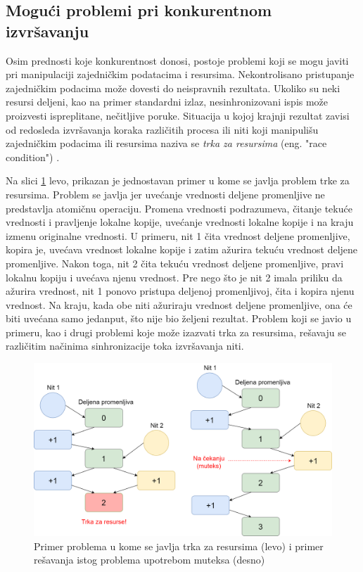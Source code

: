 \documentclass[12pt,oneside]{memoir}
\begin{document}
\subsection{Mogući problemi pri konkurentnom izvršavanju}

Osim prednosti koje konkurentnost donosi, postoje problemi koji se mogu javiti pri manipulaciji zajedničkim podatacima i resursima. Nekontrolisano pristupanje zajedničkim podacima može dovesti do neispravnih rezultata. Ukoliko su neki resursi deljeni, kao na primer standardni izlaz, nesinhronizovani ispis može proizvesti ispreplitane, nečitljive poruke. Situacija u kojoj krajnji rezultat zavisi od redosleda izvršavanja koraka različitih procesa ili niti koji manipulišu zajedničkim podacima ili resursima naziva se \textit{trka za resursima} (eng. "race condition") \cite{os}.

Na slici \ref{fig:race} levo, prikazan je jednostavan primer u kome se javlja problem trke za resursima. Problem se javlja jer uvećanje vrednosti deljene promenljive ne predstavlja atomičnu operaciju. Promena vrednosti podrazumeva, čitanje tekuće vrednosti i pravljenje lokalne kopije, uvećanje vrednosti lokalne kopije i na kraju izmenu originalne vrednosti. U primeru, nit 1 čita vrednost deljene promenljive, kopira je, uvećava vrednost lokalne kopije i zatim ažurira tekuću vrednost deljene promenljive. Nakon toga, nit 2 čita tekuću vrednost deljene promenljive, pravi lokalnu kopiju i uvećava njenu vrednost. Pre nego što je nit 2 imala priliku da ažurira vrednost, nit 1 ponovo pristupa deljenoj promenljivoj, čita i kopira njenu vrednost. Na kraju, kada obe niti ažuriraju vrednost deljene promenljive, ona će biti uvećana samo jedanput, što nije bio željeni rezultat. Problem koji se javio u primeru, kao i drugi problemi koje može izazvati trka za resursima, rešavaju se različitim načinima sinhronizacije toka izvršavanja niti.

\begin{figure}
\begin{center}
\includegraphics[scale=0.22]{race.png}
\end{center}
\caption{Primer problema u kome se javlja trka za resursima (levo) i primer rešavanja istog problema upotrebom muteksa (desno) }
\label{fig:race}
\end{figure}
\end{document}
